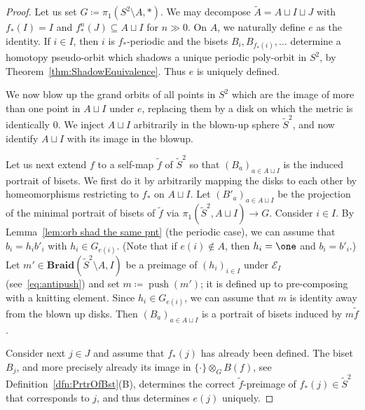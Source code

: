 \documentclass{amsart}
\newcommand\Antipush{{\mathcal E}}
\newcommand\Push{{\operatorname{push}}}
\newcommand\Braid{{\mathbf{Braid}}}
\newcommand\wtf{{\widetilde f}}
\newcommand\wtA{{\widetilde A}}
\begin{document}
\begin{proof}
  Let us set $G\coloneqq\pi_1(S^2\setminus A,*)$.  We may decompose
  $\wtA=A\sqcup I\sqcup J$ with $f_*(I)=I$ and
  $f_*^n(J)\subseteq A\sqcup I$ for $n\gg0$. On $A$, we naturally
  define $e$ as the identity. If $i\in I$, then $i$ is $f_*$-periodic
  and the bisets $B_i,B_{f_*(i)},\dots$ determine a homotopy
  pseudo-orbit which shadows a unique periodic poly-orbit in $S^2$, by
  Theorem~\ref{thm:ShadowEquivalence}. Thus $e$ is uniquely defined.

  We now blow up the grand orbits of all points in $S^2$ which are the
  image of more than one point in $ A\sqcup I$ under $e$, replacing
  them by a disk on which the metric is identically $0$. We inject
  $ A\sqcup I$ arbitrarily in the blown-up sphere $\widetilde S^2$,
  and now identify $A\sqcup I$ with its image in the blowup.

  Let us next extend $f$ to a self-map $\wtf$ of
  $\widetilde S^2$ so that $(B_a)_{a\in A\sqcup I}$ is the induced
  portrait of bisets. We first do it by arbitrarily mapping the disks
  to each other by homeomorphisms restricting to $f_*$ on
  $ A\sqcup I$. Let $(B'_a)_{a\in A\sqcup I}$ be the projection of the
  minimal portrait of bisets of $\wtf$ via
  $\pi_1(\widetilde S^2,A\sqcup I) \to G$. Consider $i\in I$. By
  Lemma~\ref{lem:orb shad the same pnt} (the periodic case), we can
  assume that $b_i=h_i b'_i$ with $h_i\in G_{e(i)}$. (Note that if
  $e(i)\not\in A$, then $h_i=\one$ and $b_i=b'_i$.)  Let $m'\in \Braid(\widetilde S^2\setminus A,I)$ be a
  preimage of $(h_i)_{i\in I}$ under $\Antipush_{I}$ (see~\eqref{eq:antipush}) and set $m\coloneqq\Push(m') $; it is defined up to pre-composing with a
  knitting element. Since $h_i\in G_{e(i)}$, we can assume that $m$ is
  identity away from the blown up disks. Then $(B_a)_{a\in A\sqcup I}$
  is a portrait of bisets induced by $m\wtf$.

  Consider next $j\in J$ and assume that $f_*(j)$ has already been
  defined. The biset $B_j$, and more precisely already its image in
  $\{\cdot\}\otimes_G B(f)$, see Definition~\ref{dfn:PrtrOfBst}(B),
  determines the correct $\wtf$-preimage of $f_*(j)\in \widetilde S^2$
  that corresponds to $j$, and thus determines $e(j)$ uniquely.
\end{proof}
\end{document}
